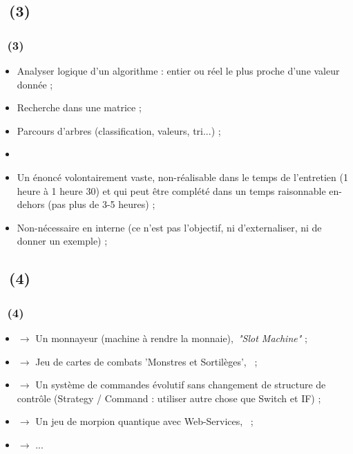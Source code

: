 \documentclass{beamer}
\begin{document}
\subsection{\titleExemplesCyberFizzBuzz ~(3)}
\begin{frame}
	\frametitle{\titleExemplesCyberFizzBuzz ~(3)}
	\begin{itemize}
		\item Analyser logique d'un algorithme : entier ou r{\'e}el le plus proche d'une valeur donn{\'e}e ; 
		\item Recherche dans une matrice ; 
		\item Parcours d'arbres (classification, valeurs, tri...) ; 
		\item[] 
		\item Un {\'e}nonc{\'e} volontairement vaste, non-r{\'e}alisable dans le temps de l'entretien (1 heure {\`a} 1 heure 30) et qui peut {\^e}tre compl{\'e}t{\'e} dans un temps raisonnable en-dehors (pas plus de 3-5 heures) ; 
		\item Non-n{\'e}cessaire en interne (ce n'est pas l'objectif, ni d'externaliser, ni de donner un exemple) ; 
	\end{itemize}
\end{frame} 

\subsection{\titleExemplesCyberFizzBuzz ~(4)}
\begin{frame}
	\frametitle{\titleExemplesCyberFizzBuzz ~(4)}
	\begin{itemize}
		\item $\rightarrow$ Un monnayeur (machine {\`a} rendre la monnaie),~\newline \emph{"Slot Machine"} ;
		\item $\rightarrow$ Jeu de cartes de combats 'Monstres et Sortil{\`e}ges',~ ;
		\item $\rightarrow$ Un syst{\`e}me de commandes {\'e}volutif sans changement de structure de contr{\^o}le (Strategy / Command : utiliser autre chose que Switch et IF) ;
		\item $\rightarrow$ Un jeu de morpion quantique avec Web-Services,~ ;
		\item $\rightarrow$ ...
	\end{itemize}
\end{frame} 
\end{document}
